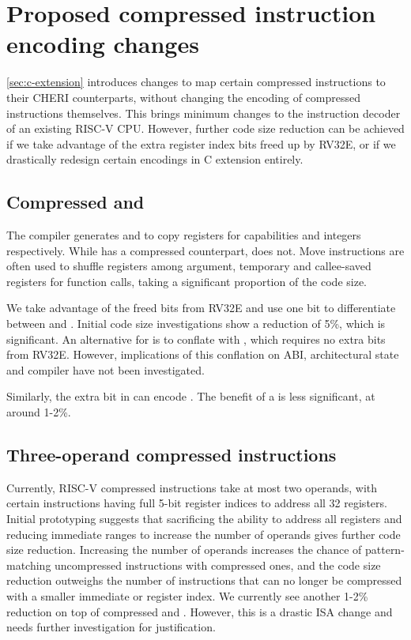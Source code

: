 \chapter{Proposed compressed instruction encoding changes}
\label{chap:c-changes}

\cref{sec:c-extension} introduces changes to map certain compressed instructions to their CHERI counterparts, without changing the encoding of compressed instructions themselves.
This brings minimum changes to the instruction decoder of an existing RISC-V CPU.
However, further code size reduction can be achieved if we take advantage of the extra register index bits freed up by RV32E, or if we drastically redesign certain encodings in C extension entirely.

\section{Compressed  and }
The compiler generates  and  to copy registers for capabilities and integers respectively.
While  has a compressed  counterpart,  does not.
Move instructions are often used to shuffle registers among argument, temporary and callee-saved registers for function calls, taking a significant proportion of the code size.

We take advantage of the freed bits from RV32E and use one bit to differentiate between  and .
Initial code size investigations show a reduction of 5\%, which is significant.
An alternative for  is to conflate  with , which requires no extra bits from RV32E.
However, implications of this conflation on ABI, architectural state and compiler have not been investigated.

Similarly, the extra bit in  can encode .
The benefit of a  is less significant, at around 1-2\%.

\section{Three-operand compressed instructions}
Currently, RISC-V compressed instructions take at most two operands, with certain instructions having full 5-bit register indices to address all 32 registers.
Initial prototyping suggests that sacrificing the ability to address all registers and reducing immediate ranges to increase the number of operands gives further code size reduction.
Increasing the number of operands increases the chance of pattern-matching uncompressed instructions with compressed ones, and the code size reduction outweighs the number of instructions that can no longer be compressed with a smaller immediate or register index.
We currently see another 1-2\% reduction on top of compressed  and .
However, this is a drastic ISA change and needs further investigation for justification.
